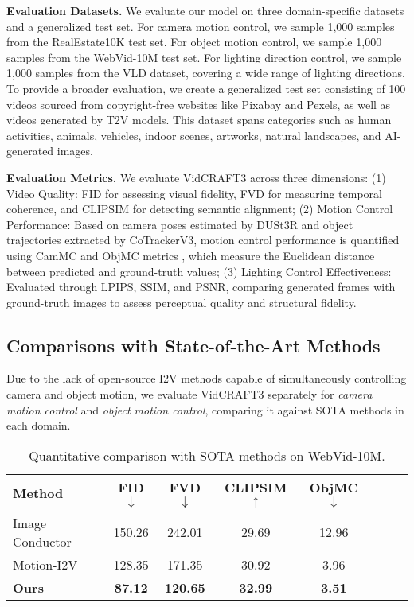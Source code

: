 \noindent \textbf{Evaluation Datasets.}
We evaluate our model on three domain-specific datasets and a generalized test set. 
For camera motion control, we sample 1,000 samples from the RealEstate10K test set. For object motion control, we sample 1,000 samples from the WebVid-10M test set. For lighting direction control, we sample 1,000 samples from the VLD dataset, covering a wide range of lighting directions. To provide a broader evaluation, we create a generalized test set consisting of 100 videos sourced from copyright-free websites like Pixabay and Pexels, as well as videos generated by T2V models. This dataset spans categories such as human activities, animals, vehicles, indoor scenes, artworks, natural landscapes, and AI-generated images.


\noindent \textbf{Evaluation Metrics.}
We evaluate VidCRAFT3 across three dimensions:
(1) Video Quality: FID for assessing visual fidelity, FVD for measuring temporal coherence, and CLIPSIM for detecting semantic alignment;
(2) Motion Control Performance: Based on camera poses estimated by DUSt3R and object trajectories extracted by CoTrackerV3, motion control performance is quantified using CamMC and ObjMC metrics \cite{wang2024motionctrl}, which measure the Euclidean distance between predicted and ground-truth values;
(3) Lighting Control Effectiveness: Evaluated through LPIPS, SSIM, and PSNR, comparing generated frames with ground-truth images to assess perceptual quality  and structural fidelity.



\subsection{Comparisons with State-of-the-Art Methods}

Due to the lack of open-source I2V methods capable of simultaneously controlling camera and object motion, we evaluate VidCRAFT3 separately for \textit{camera motion control} and \textit{object motion control}, comparing it against SOTA methods in each domain.

\setlength{\tabcolsep}{4pt}
\begin{table}
\vspace{-5pt}
\scriptsize
\centering
\begin{tabular}{lccccccc}
\toprule
\textbf{Method} & FID$\downarrow$    & FVD$\downarrow$    & CLIPSIM$\uparrow$ & ObjMC$\downarrow$ \\
\midrule
Image Conductor & 150.26         & 242.01          & 29.69            &  12.96          \\
Motion-I2V      & 128.35         & 171.35          & 30.92            &  3.96           \\
\rowcolor[HTML]{EFEFEF}
\textbf{Ours}            & \textbf{87.12} & \textbf{120.65} & \textbf{32.99}   &  \textbf{3.51} \\
\bottomrule
\end{tabular}
\caption{Quantitative comparison with SOTA methods on WebVid-10M.}
\label{tab:result_webvid10m}
\vspace{-5pt}
\end{table}







